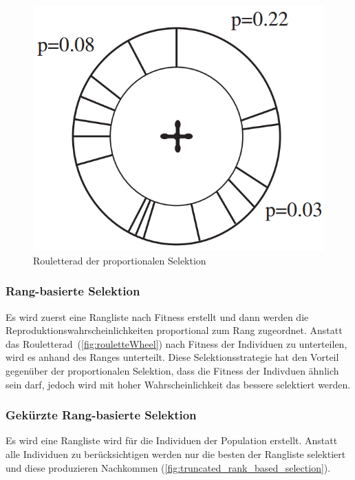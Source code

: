         \begin{figure}[H]
          \includegraphics[scale=0.4,center]{graphics/roulettewheel}
          \caption[\protect{}, S.24]{Rouletterad der proportionalen Selektion\label{fig:rouletteWheel}}
        \end{figure}

      \subsubsection{Rang-basierte Selektion}

        Es wird zuerst eine Rangliste nach Fitness erstellt und dann werden die Reproduktionswahrscheinlichkeiten proportional zum Rang zugeordnet.
        Anstatt das Rouletterad~(\vref{fig:rouletteWheel}) nach Fitness der Individuen zu unterteilen,
        wird es anhand des Ranges unterteilt.
        Diese Selektionsstrategie hat den Vorteil gegenüber der proportionalen Selektion,
        dass die Fitness der Indivduen ähnlich sein darf,
        jedoch wird mit hoher Wahrscheinlichkeit das bessere selektiert werden.

      \subsubsection{Gekürzte Rang-basierte Selektion}

        Es wird eine Rangliste wird für die Individuen der Population erstellt.
        Anstatt alle Individuen zu berücksichtigen werden nur die besten der Rangliste selektiert und diese produzieren Nachkommen (\vref{fig:truncated_rank_based_selection}).


